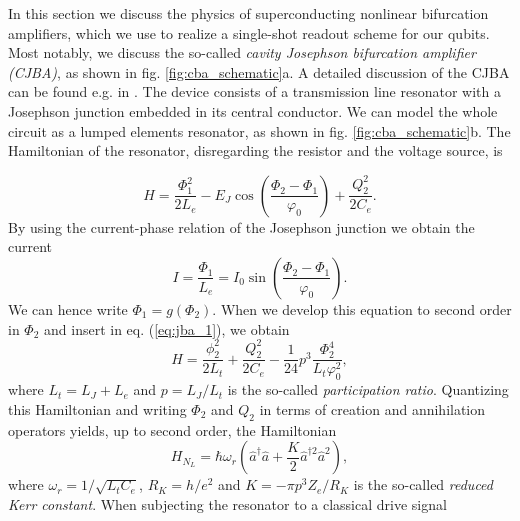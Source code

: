 In this section we discuss the physics of superconducting nonlinear bifurcation amplifiers, which we use to realize a single-shot readout scheme for our qubits. Most notably, we discuss the so-called {\it cavity Josephson bifurcation amplifier (CJBA)}, as shown in fig. \ref{fig:cba_schematic}a. A detailed discussion of the CJBA can be found e.g. in \cite{palacios-laloy_superconducting_2010}. The device consists of a transmission line resonator with a Josephson junction embedded in its central conductor. We can model the whole circuit as a lumped elements resonator, as shown in fig. \ref{fig:cba_schematic}b. The Hamiltonian of the resonator, disregarding the resistor and the voltage source, is

%
\begin{equation}
H = \frac{\Phi_1^2}{2L_e}-E_J\cos{\left(\frac{\Phi_2-\Phi_1}{\varphi_0}\right)}+\frac{Q_2^2}{2C_e}. \label{eq:jba_1}
\end{equation}
%
By using the current-phase relation of the Josephson junction we obtain the current
%
\begin{equation}
I = \frac{\Phi_1}{L_e} = I_0 \sin{\left(\frac{\Phi_2-\Phi_1}{\varphi_0}\right)}.
\end{equation}
%
We can hence write $\Phi_1 = g(\Phi_2)$. When we develop this equation to second order in $\Phi_2$ and insert in eq. (\ref{eq:jba_1}), we obtain
%
\begin{equation}
H = \frac{\phi_2^2}{2L_t}+\frac{Q_2^2}{2C_e}-\frac{1}{24}p^3\frac{\Phi_2^4}{L_t \varphi_0^2},
\end{equation}
%
where $L_t = L_J+L_e$ and $p=L_J/L_t$ is the so-called {\it participation ratio}. Quantizing this Hamiltonian and writing $\Phi_2$ and $Q_2$ in terms of creation and annihilation operators yields, up to second order, the Hamiltonian
%
\begin{equation}
H_{N_L} = \hbar\omega_r \left(\hat{a}^\dagger \hat{a}+\frac{K}{2}\hat{a}^{\dagger 2}\hat{a}^2\right),
\end{equation}
%
where $\omega_r=1/\sqrt{L_t C_e}$, $R_K=h/e^2$ and $K=-\pi p^3 Z_e / R_K$ is the so-called {\it reduced Kerr constant}. When subjecting the resonator to a classical drive signal

